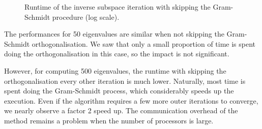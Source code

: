 \begin{figure}[H]
  \centering
  
  \caption{Runtime of the inverse subspace iteration with skipping the Gram-Schmidt procedure (log scale).}
\end{figure}

The performances for 50 eigenvalues are similar when not skipping the Gram-Schmidt orthogonalisation.
We saw that only a small proportion of time is spent doing the orthogonalisation in this case, so the impact is not significant.

However, for computing 500 eigenvalues, the runtime with skipping the orthogonalisation every other iteration is much lower.
Naturally, most time is spent doing the Gram-Schmidt process, which considerably speeds up the execution.
Even if the algorithm requires a few more outer iterations to converge, we nearly observe a factor 2 speed up.
The communication overhead of the method remains a problem when the number of processors is large.
